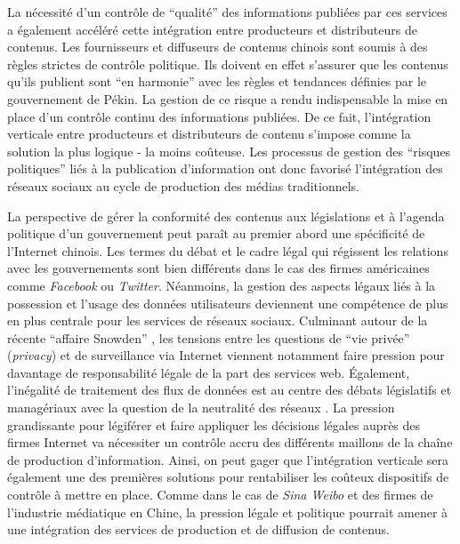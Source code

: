 La nécessité d'un contrôle de ``qualité'' des informations publiées par ces services a également accéléré cette intégration entre producteurs et distributeurs de contenus. Les fournisseurs et diffuseurs de contenus chinois sont soumis à des règles strictes de contrôle politique. Ils doivent en effet s'assurer que les contenus qu'ils publient sont ``en harmonie'' avec les règles et tendances définies par le gouvernement de Pékin. La gestion de ce risque a rendu indispensable la mise en place d'un contrôle continu des informations publiées. De ce fait, l'intégration verticale entre producteurs et distributeurs de contenu s'impose comme la solution la plus logique - la moins coûteuse. Les processus de gestion des ``risques politiques'' liés à la publication d'information  ont donc favorisé l'intégration des réseaux sociaux au cycle de production des médias traditionnels.

La perspective de gérer la conformité des contenus aux législations et à l'agenda politique d'un gouvernement peut paraît au premier abord une spécificité de l'Internet chinois. Les termes du débat et le cadre légal qui régissent les relations avec les gouvernements sont bien différents dans le cas des firmes américaines comme \textit{Facebook} ou \textit{Twitter}. Néanmoins, la gestion des aspects légaux liés à la possession et l'usage des données utilisateurs deviennent une compétence de plus en plus centrale pour les services de réseaux sociaux. Culminant autour de la récente ``affaire Snowden'' \citep{Greenwald2013}, les tensions entre les questions de ``vie privée'' (\textit{privacy}) et de surveillance via Internet viennent notamment faire pression pour davantage de responsabilité légale de la part des services web. Également, l'inégalité de traitement des flux de données est au centre des débats législatifs et managériaux avec la question de la neutralité des réseaux \citep{Schafer2011}. La pression grandissante pour légiférer et faire appliquer les décisions légales auprès des firmes Internet va nécessiter un contrôle accru des différents maillons de la chaîne de production d'information. Ainsi, on peut gager que l'intégration verticale sera également une des premières solutions pour rentabiliser les coûteux dispositifs de contrôle à mettre en place. Comme dans le cas de \textit{Sina Weibo} et des firmes de l'industrie médiatique en Chine, la pression légale et politique pourrait amener à une intégration des services de production et de diffusion de contenus.

